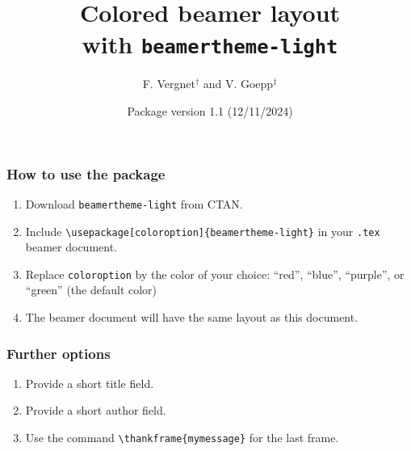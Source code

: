 \documentclass[10pt, compress]{beamer}
\title[The package \texttt{light}]{Colored beamer layout \\ with \texttt{beamertheme-light}}
\author[F. Vergnet and V. Goepp]{F. Vergnet$^\dagger$ and V. Goepp$^{\ddagger}$}
\institute{$\dagger$ : LMO, Universit\'e Paris-Sud, Universit\'e Paris-Saclay,  \\ $\ddagger$ : MAP5, Universit\'e Paris-Descartes}
\date{Package version 1.1 (12/11/2024)}
\begin{document}
{
\begin{frame}
	\titlepage
\end{frame}
}

\begin{frame}
	\frametitle{How to use the package}
	\begin{enumerate}
	\item Download \texttt{beamertheme-light} from CTAN.
	\item Include \texttt{\textbackslash usepackage[coloroption]\{beamertheme-light\}} in your \texttt{.tex} beamer document.
	\item Replace \texttt{coloroption} by the color of your choice: ``red'', ``blue'', ``purple'', or ``green'' (the default color)
	\item The beamer document will have the same layout as this document.
	\end{enumerate}
\end{frame}

\begin{frame}
		\frametitle{Further options}
		\begin{enumerate}
				\item Provide a short title field.
				\item Provide a short author field.
				\item Use the command \texttt{\textbackslash thankframe\{mymessage\}} for the last frame.
		\end{enumerate}
\end{frame}
	
\end{document}
